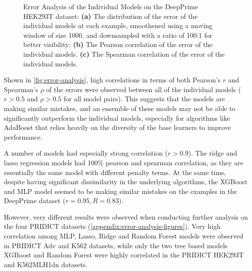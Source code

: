 \begin{figure}
    \centering
    \caption[Error Analysis of the Individual Models]{Error Analysis of the Individual Models on the DeepPrime HEK293T dataset: \textbf{(a)} The distribution of the error of the individual models at each example, smoothened using a moving window of size 1000, and downsampled with a ratio of 100:1 for better visibility; \textbf{(b)} The Pearson correlation of the error of the individual models. \textbf{(c)} The Spearman correlation of the error of the individual models.}
    \label{fig:error-analysis}
\end{figure}

Shown in \autoref{fig:error-analysis}, high correlations in terms of both Pearson's $r$ and Spearman's $\rho$ of the errors were observed between all of the individual models ($r>0.5$ and $\rho>0.5$ for all model pairs). This suggests that the models are making similar mistakes, and an ensemble of these models may not be able to significantly outperform the individual models, especially for algorithms like AdaBoost that relies heavily on the diversity of the base learners to improve performance.

A number of models had especially strong correlation ($r>0.9$). The ridge and lasso regression models had 100\% pearson and spearman correlation, as they are essentially the same model with different penalty terms. At the same time, despite having significant dissimilarity in the underlying algorithms, the XGBoost and MLP model seemed to be making similar mistakes on the examples in the DeepPrime dataset ($r=0.95, R=0.83$).

However, very different results were observed when conducting further analysis on the four PRIDICT datasets (\autoref{appendix:error-analysis-figures}). Very high correlation among MLP, Lasso, Ridge and Random Forest models were observed in PRIDICT Adv and K562 datasets, while only the two tree based models XGBoost and Random Forest were highly correlated in the PRIDICT HEK293T and K562MLH1dn datasets.  

